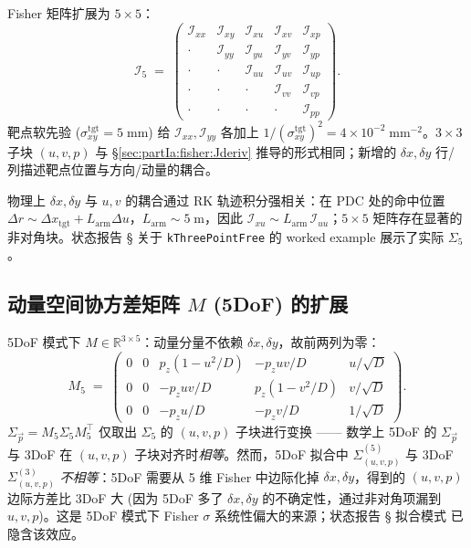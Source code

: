 Fisher 矩阵扩展为 $5\times 5$：
\begin{equation}
  \mathcal I_5 \;=\;
  \begin{pmatrix}
    \mathcal I_{xx} & \mathcal I_{xy} & \mathcal I_{xu} & \mathcal I_{xv} & \mathcal I_{xp}\\
    \cdot & \mathcal I_{yy} & \mathcal I_{yu} & \mathcal I_{yv} & \mathcal I_{yp}\\
    \cdot & \cdot & \mathcal I_{uu} & \mathcal I_{uv} & \mathcal I_{up}\\
    \cdot & \cdot & \cdot & \mathcal I_{vv} & \mathcal I_{vp}\\
    \cdot & \cdot & \cdot & \cdot & \mathcal I_{pp}
  \end{pmatrix}.
\end{equation}
靶点软先验 ($\sigma_{xy}^\mathrm{tgt}=5\;\mathrm{mm}$) 给 $\mathcal I_{xx},\mathcal I_{yy}$ 各加上 $1/(\sigma_{xy}^\mathrm{tgt})^2=4\times 10^{-2}\;\mathrm{mm}^{-2}$。$3\times 3$ 子块 $(u,v,p)$ 与 §\ref{sec:partIa:fisher:Jderiv} 推导的形式相同；新增的 $\delta x,\delta y$ 行/列描述靶点位置与方向/动量的耦合。

物理上 $\delta x,\delta y$ 与 $u,v$ 的耦合通过 RK 轨迹积分强相关：在 PDC 处的命中位置 $\Delta r\sim\Delta x_\mathrm{tgt}+L_\mathrm{arm}\Delta u$，$L_\mathrm{arm}\sim 5\;\mathrm m$，因此 $\mathcal I_{xu}\sim L_\mathrm{arm}\,\mathcal I_{uu}$；$5\times 5$ 矩阵存在显著的非对角块。状态报告 \StatusReport § 关于 \texttt{kThreePointFree} 的 worked example 展示了实际 $\Sigma_5$。

\subsection{动量空间协方差矩阵 $M$ (5DoF) 的扩展}
\label{sec:partIa:fisher:M5}

5DoF 模式下 $M\in\mathbb R^{3\times 5}$：动量分量不依赖 $\delta x,\delta y$，故前两列为零：
\begin{equation}
  M_5 \;=\;
  \begin{pmatrix}
    0 & 0 & p_z(1-u^2/D) & -p_z uv/D & u/\sqrt D\\
    0 & 0 & -p_z uv/D & p_z(1-v^2/D) & v/\sqrt D\\
    0 & 0 & -p_z u/D & -p_z v/D & 1/\sqrt D
  \end{pmatrix}.
\end{equation}
$\Sigma_{\vec p}=M_5\Sigma_5 M_5^\top$ 仅取出 $\Sigma_5$ 的 $(u,v,p)$ 子块进行变换 —— 数学上 5DoF 的 $\Sigma_{\vec p}$ 与 3DoF 在 $(u,v,p)$ 子块对齐时\emph{相等}。然而，5DoF 拟合中 $\Sigma_{(u,v,p)}^{(5)}$ 与 3DoF $\Sigma_{(u,v,p)}^{(3)}$ \emph{不相等}：5DoF 需要从 5 维 Fisher 中边际化掉 $\delta x,\delta y$，得到的 $(u,v,p)$ 边际方差比 3DoF 大 (因为 5DoF 多了 $\delta x,\delta y$ 的不确定性，通过非对角项漏到 $u,v,p$)。这是 5DoF 模式下 Fisher $\sigma$ 系统性偏大的来源；状态报告 § 拟合模式 已隐含该效应。

